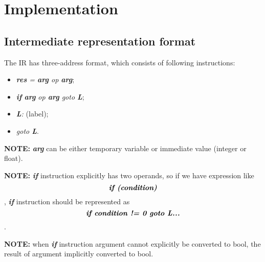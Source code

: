 \documentclass{article}
\begin{document}
	\section{Implementation}
	
		\subsection{Intermediate representation format}
			The IR has three-address format, which consists of following instructions:
			
			\begin{itemize}
				\item \textit{\textbf{res} = \textbf{arg} op \textbf{arg}};
				
				\item \textit{\textbf{if} \textbf{arg} op \textbf{arg} goto 
				\textbf{L}};

				\item \textit{\textbf{L}:} (label);

				\item \textit{goto \textbf{L}}.
			\end{itemize}
			
			\noindent \textbf{NOTE:} \textbf{\textit{arg}} can be either temporary variable
			or immediate value (integer or float).
				
			\bigbreak
				
			\noindent \textbf{NOTE:} \textbf{\textit{if}} instruction explicitly has two 
			operands, so if	we have expression like \[\textbf{\textit{if (condition)}}\],
			 \textbf{\textit{if}} instruction should be represented as
			 \[\textbf{\textit{if condition != 0 goto L...}}\].
			 
			 \bigbreak
			 
			 \noindent \textbf{NOTE:} when \textbf{\textit{if}} instruction argument
			 cannot explicitly be converted to bool, the result of argument implicitly
			 converted to bool.
			
\end{document}
